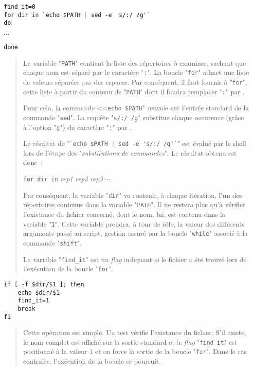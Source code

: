 \begin{verbatim}
find_it=0
for dir in `echo $PATH | sed -e 's/:/ /g'`
do
\end{verbatim}
\vspace{2ex}
$\cdots$
\\[2ex]
\begin{verbatim}
done
\end{verbatim}
\begin{quote}
La variable "{\tt PATH}" contient la liste des r{\'e}pertoires {\`a} examiner, sachant que
chaque nom est s{\'e}par{\'e} par le caract{\`e}re "{\tt :}". La boucle "{\tt for}"
admet une liste de valeurs s{\'e}par{\'e}es par des espaces. Par cons{\'e}quent, il faut fournir
{\`a} "{\tt for}", cette liste {\`a} partir du contenu de "{\tt PATH}" dont il faudra
remplacer "{\tt :}" par \spacekey.

Pour cela, la commande <<\verb,echo $PATH," renvoie sur l'entr{\'e}e standard de la
commande "{\tt sed}". La requ{\^e}te "\verb*,s/:/ /g," substitue chaque
occurence (gr{\^a}ce {\`a} l'option "{\tt g}") du caract{\`e}re "{\tt :}" par
\spacekey.

Le r{\'e}sultat de "\verb*,`echo $PATH | sed -e 's/:/ /g'`," est {\'e}valu{\'e} par le
shell lors de l'{\'e}tape des "{\sl substitutions de commandes}". Le r{\'e}sultat obtenu
est donc~:
\begin{center}
\verb,for dir in, {\sl rep1} {\sl rep2} {\sl rep3} $\cdots$ 
\end{center}
Par cons{\'e}quent, la variable "{\tt dir}" va contenir, {\`a} chaque it{\'e}ration, l'un
des r{\'e}pertoires contenus dans la variable "{\tt PATH}". Il ne restera plus qu'{\`a}
v{\'e}rifier l'existance du fichier concern{\'e}, dont le nom, lui, est contenu dans la variable
"{\tt 1}". Cette variable prendra, {\`a} tour de r{\^o}le, la valeur des diff{\'e}rents
arguments pass{\'e} au script, gestion assur{\'e} par la boucle "{\tt while}" associ{\'e}
{\`a} la commande "{\tt shift}".

La variable "{\tt find\_it}" est un {\it flag} indiquant si le fichier a {\'e}t{\'e} trouv{\'e}
lors de l'ex{\'e}cution de la boucle "{\tt for}".
\end{quote}

\begin{verbatim}
if [ -f $dir/$1 ]; then
    echo $dir/$1
    find_it=1
    break
fi
\end{verbatim}
\begin{quote}
Cette op{\'e}ration est simple. Un test v{\'e}rifie l'existance du fichier. S'il existe, le nom complet
est affich{\'e} sur la sortie standard et le {\it flag} "{\tt find\_it}"
est positionn{\'e} {\`a} la valeur $1$ et on force la sortie de la boucle "{\tt for}". Dans le
cas contraire, l'ex{\'e}cution de la boucle se poursuit.
\end{quote}

